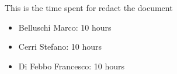This is the time spent for redact the document
\begin{itemize}
	\item Belluschi Marco:  10 hours
	\item Cerri Stefano:  10 hours
	\item Di Febbo Francesco: 10 hours
\end{itemize}